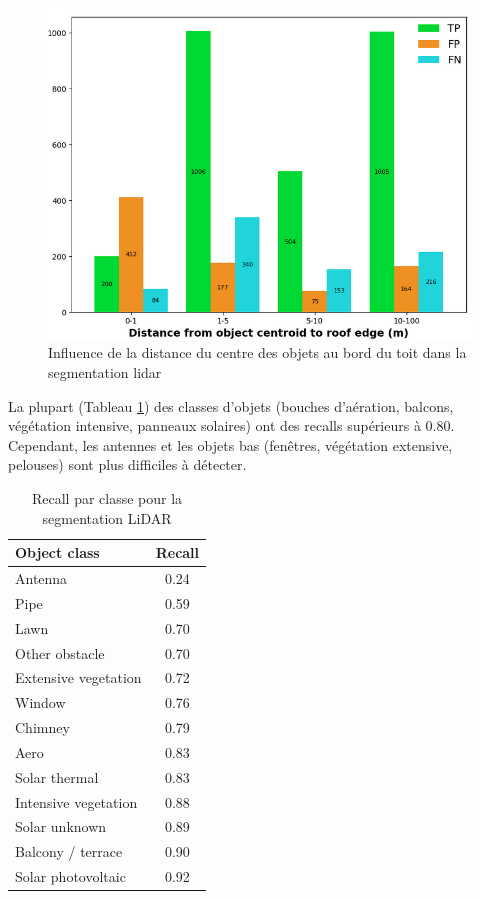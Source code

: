 \begin{figure}[H]
    \centering
    \includegraphics[width=1\linewidth]{02-main//figures/ch2/stdl_07_segmentation_lidar_distances.png}
    \caption{Influence de la distance du centre des objets au bord du toit dans la segmentation \gls{lidar} \cite{herny_detection_2024}}
    \label{fig:stdl_07_segmentation_lidar_distances}
\end{figure}
\newpage
\par{La plupart (Tableau \ref{tab:stdl_03_resultats_segmentation_lidar_classes}) des classes d'objets (bouches d'aération, balcons, végétation intensive, panneaux solaires) ont des recalls supérieurs à 0.80. Cependant, les antennes et les objets bas (fenêtres, végétation extensive, pelouses) sont plus difficiles à détecter.}

\begin{table}[H]
    \centering
    \begin{tabular}{|l|c|}
    \hline
    Object class & Recall \\
    \hline
    Antenna & 0.24 \\
    Pipe & 0.59 \\
    Lawn & 0.70 \\
    Other obstacle & 0.70 \\
    Extensive vegetation & 0.72 \\
    Window & 0.76 \\
    Chimney & 0.79 \\
    Aero & 0.83 \\
    Solar thermal & 0.83 \\
    Intensive vegetation & 0.88 \\
    Solar unknown & 0.89 \\
    Balcony / terrace & 0.90 \\
    Solar photovoltaic & 0.92 \\
    \hline
    \end{tabular}
    \caption{Recall par classe pour la segmentation LiDAR}
    \label{tab:stdl_03_resultats_segmentation_lidar_classes}
\end{table}

